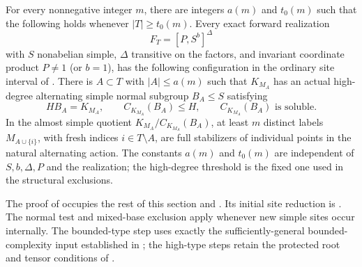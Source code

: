 \begin{theorem}\label{r:forward-marker}
For every nonnegative integer $m$, there are integers $a(m)$ and
$t_0(m)$ such that the following holds whenever $|T|\ge t_0(m)$.
Every exact forward realization
\[
 F_T=[P,S^b]^\Delta
\]
with $S$ nonabelian simple, $\Delta$ transitive on the factors,
and invariant coordinate product $P\ne1$ (or $b=1$), has the
following configuration in the ordinary site interval of
.  There is $A\subset T$ with $|A|\le a(m)$
such that $K_{M_A}$ has an actual high-degree alternating simple
normal subgroup $B_A\le S$ satisfying
\[
 HB_A=K_{M_A},\qquad
 C_{K_{M_A}}(B_A)\le H,
 \qquad C_{K_{M_A}}(B_A)\text{ is soluble}.
\]
In the almost simple quotient
$K_{M_A}/C_{K_{M_A}}(B_A)$, at least $m$ distinct labels
$M_{A\cup\{i\}}$, with fresh indices $i\in T\setminus A$,
are full stabilizers of individual points in the natural
alternating action.  The constants $a(m)$ and $t_0(m)$ are independent
of $S,b,\Delta,P$ and the realization; the high-degree threshold is
the fixed one used in the structural exclusions.
\end{theorem}

The proof of  occupies the rest of this
section and .  Its initial site
reduction is .  The normal test and mixed-base
exclusion apply whenever new simple sites occur internally.
The bounded-type step uses exactly the sufficiently-general
bounded-complexity input established in ; the
high-type steps retain the protected root and tensor conditions
of .

